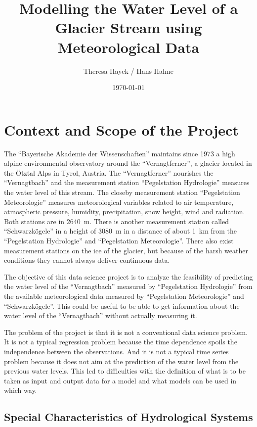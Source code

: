 \documentclass[a4paper,12pt]{article}
\title{Modelling the Water Level of a Glacier Stream using Meteorological Data}
\author{Theresa Hayek / Hans Hahne}
\date{\today}
\begin{document}
\maketitle
\tableofcontents

\newpage

\section{Context and Scope of the Project}

The ``Bayerische Akademie der Wissenschaften'' maintains since 1973 a high alpine environmental observatory around the ``Vernagtferner'', a glacier located in the Ötztal Alps in Tyrol, Austria. The ``Vernagtferner'' nourishes the ``Vernagtbach'' and the measurement station ``Pegelstation Hydrologie'' measures the water level of this stream. The closeby measurement station ``Pegelstation Meteorologie'' measures meteorological variables related to air temperature, atmospheric pressure, humidity, precipitation, snow height, wind and radiation. Both stations are in 2640~m. There is another measurement station called ``Schwarzkögele'' in a height of 3080~m in a distance of about 1~km from the ``Pegelstation Hydrologie'' and ``Pegelstation Meteorologie''. There also exist measurement stations on the ice of the glacier, but because of the harsh weather conditions they cannot always deliver continuous data.

The objective of this data science project is to analyze the feasibility of predicting the water level of the ``Vernagtbach'' measured by ``Pegelstation Hydrologie'' from the available meteorological data measured by ``Pegelstation Meteorologie'' and ``Schwarzkögele''. This could be useful to be able to get information about the water level of the ``Vernagtbach'' without actually measuring it.

The problem of the project is that it is not a conventional data science problem. It is not a typical regression problem because the time dependence spoils the independence between the observations. And it is not a typical time series problem because it does not aim at the prediction of the water level from the previous water levels. This led to difficulties with the definition of what is to be taken as input and output data for a model and what models can be used in which way.

\subsection{Special Characteristics of Hydrological Systems}
\end{document}
